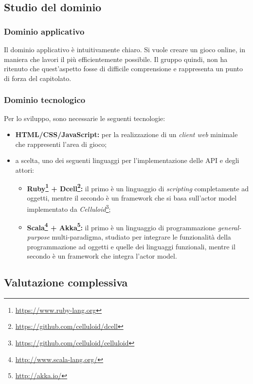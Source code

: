 \subsection{Studio del dominio}
\label{dominiocap5}
\subsubsection{Dominio applicativo}
\label{dominioapp5}
Il dominio applicativo è intuitivamente chiaro. Si vuole creare un gioco online, in maniera che lavori il più efficientemente possibile. Il gruppo quindi, non ha ritenuto che quest'aspetto fosse di difficile comprensione e rappresenta un punto di forza del capitolato.

\subsubsection{Dominio tecnologico}
\label{dominiotec5}
Per lo sviluppo, sono necessarie le seguenti tecnologie:
\begin{itemize}
\item\textbf{HTML/CSS/JavaScript:} per la realizzazione di un \textit{client web} minimale che rappresenti l'area di gioco;
\item a scelta, uno dei seguenti linguaggi per l'implementazione delle API\glossario{} e degli attori:
\begin{itemize}
\item\textbf{Ruby\footnote{\url{https://www.ruby-lang.org}} + Dcell\footnote{\url{https://github.com/celluloid/dcell}}:} il primo è un linguaggio di \textit{scripting} completamente ad oggetti, mentre il secondo è un framework\glossario{} che si basa sull'actor model implementato da \textit{Celluloid}\footnote{\url{https://github.com/celluloid/celluloid}};
\item\textbf{Scala\footnote{\url{http://www.scala-lang.org/}} + Akka\footnote{\url{http://akka.io/}}:} il primo è un linguaggio di programmazione \textit{general-purpose} multi-paradigma, studiato per integrare le funzionalità della programmazione ad oggetti e quelle dei linguaggi funzionali, mentre il secondo è un framework\glossario{} che integra l'actor model.
\end{itemize}
\end{itemize}

\subsection{Valutazione complessiva}
\label{valutazione5}
